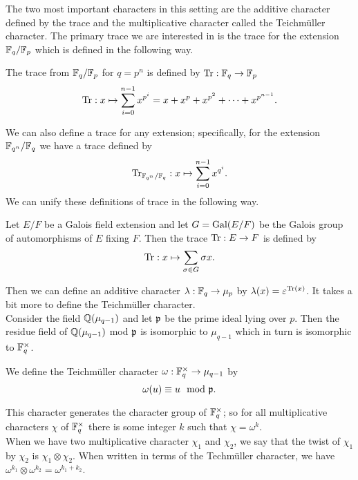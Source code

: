The two most important characters in this setting are the additive character defined by the trace and the multiplicative character called the Teichm\"uller character. 
The primary trace we are interested in is the trace for the extension $\mathbb{F}_q / \mathbb{F}_p$ which is defined in the following way.
\begin{defn}
The trace from $\mathbb{F}_q / \mathbb{F}_p$ for $q = p^n$ is defined by $\textrm{Tr} : \mathbb{F}_q \to \mathbb{F}_p$
 \[ \textrm{Tr} : x \mapsto \sum_{i=0}^{n-1} x^{p^i} = x + x^p + x^{p^2} + \cdots + x^{p^{n-1}}.\]
\end{defn}
We can also define a trace for any extension; specifically, for the extension $\mathbb{F}_{q^n}/\mathbb{F}_q$ we have a trace defined by \[\textrm{Tr}_{\mathbb{F}_{q^n}/\mathbb{F}_q} : x \mapsto \sum_{i=0}^{n-1} x^{q^i}.\] 
We can unify these definitions of trace in the following way.
\begin{defn}
Let $E/F$ be a Galois field extension and let $G = \textrm{Gal}(E/F)$ be the Galois group of automorphisms of $E$ fixing $F$. 
Then the trace $\textrm{Tr} : E \to F$ is defined by \[\textrm{Tr} : x \mapsto \sum_{\sigma \in G} \sigma x.\]
\end{defn}

\noindent Then we can define an additive character $\lambda : \mathbb{F}_q \to \mu_p$ by $\lambda(x) = \varepsilon^{\textrm{Tr}(x)}$.
It takes a bit more to define the Teichm\"uller character.\\

Consider the field $\mathbb{Q}(\mu_{q-1})$ and let $\mathfrak{p}$ be the prime ideal lying over $p$.
Then the residue field of $\mathbb{Q}(\mu_{q-1})$ mod $\mathfrak{p}$ is isomorphic to $\mu_{q-1}$ which in turn is isomorphic to $\mathbb{F}_q^\times$.
\begin{defn}\label{def:Teichmuller-char}
We define the Teichm\"uller character $\omega : \mathbb{F}_q^\times \to \mu_{q-1}$ by \[\omega (u) \equiv  u \mod {\mathfrak{p}}.\]
\end{defn}
\noindent This character generates the character group of $\mathbb{F}_q^\times$; so for all multiplicative characters $\chi$ of $\mathbb{F}_q^\times$ there is some integer $k$ such that $\chi = \omega^k$.\\
When we have two multiplicative character $\chi_1$ and $\chi_2$, we say that the twist of $\chi_1$ by $\chi_2$ is $\chi_1 \otimes \chi_2$.
When written in terms of the Techm\"uller character, we have $\omega^{k_1} \otimes \omega^{k_2} = \omega^{k_1+k_2}$.

